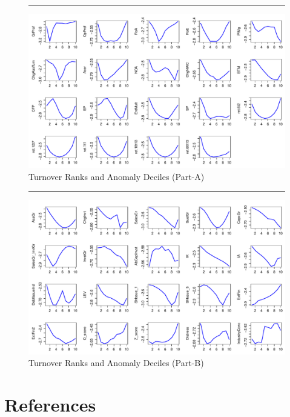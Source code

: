 \documentclass[
  11pt,
  a4paper,
  twoside,
  onecolumn]{article}
\begin{document}
\begin{landscape}
\begin{figure}
\caption{Turnover Ranks and Anomaly Deciles (Part-A)}
\label{fig:trading_with_anomaly_deciles_1}
\rule[0.25ex]{\linewidth}{1pt}
\begin{center}
\includegraphics{trading_with_anomaly_deciles_1.pdf}
\end{center}
\end{figure}
\end{landscape}
\restoregeometry

\begin{landscape}
\begin{figure}
\caption{Turnover Ranks and Anomaly Deciles (Part-B)}
\label{fig:trading_with_anomaly_deciles_2}
\rule[0.25ex]{\linewidth}{1pt}
\begin{center}
\includegraphics{trading_with_anomaly_deciles_2.pdf}
\end{center}
\end{figure}
\end{landscape}
\restoregeometry

\clearpage

\hypertarget{references}{%
\section*{References}\label{references}}


\clearpage
\end{document}
